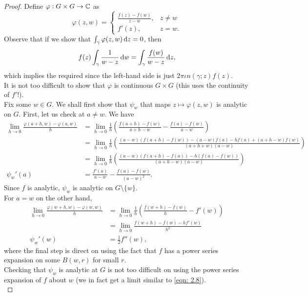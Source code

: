 	\begin{proof}
		Define $\varphi : G \times G \to \mathbb{C}$ as
		\[ \varphi(z,w) =
			\begin{cases}
				\frac{f(z) - f(w)}{z-w}, & z\ne w \\
				f'(z), & z=w.
			\end{cases}
		\]
		Observe that if we show that $\int_\gamma \varphi(z,w) \dif z = 0$, then
		\[ f(z) \int_\gamma \frac{1}{w-z} \dif w = \int_\gamma \frac{f(w)}{w-z} \dif z, \]
		which implies the required since the left-hand side is just $2\pi\iota n(\gamma;z) f(z)$.\\
		It is not too difficult to show that $\varphi$ is continuous $G\times G$ (this uses the continuity of $f'$!).\\
		Fix some $w \in G$. We shall first show that $\psi_w$ that maps $z \mapsto \varphi(z,w)$ is analytic on $G$. First, let us check at $a \ne w$. We have
		\begin{align*}
		 	\lim_{h\to 0} \frac{\varphi(a+h,w) - \varphi(a,w)}{h} &= \lim_{h\to 0} \frac{1}{h} \left( \frac{f(a+h) - f(w)}{a+h-w} - \frac{f(a) - f(w)}{a-w} \right) \\
		 		&= \lim_{h \to 0} \frac{1}{h} \left( \frac{(a-w) (f(a+h) - f(w)) - (a-w) f(a) - hf(a) + (a+h-w)f(w)}{(a+h+w)(a-w)} \right) \\
		 		&= \lim_{h \to 0} \frac{1}{h} \left( \frac{(a-w)(f(a+h)-f(a)) - h(f(a)-f(w))}{(a+h-w)(a-w)} \right) \\
		 	\psi_w'(a) &= \frac{f'(a)}{a-w} - \frac{f(a)-f(w)}{(a-w)^2}.
		\end{align*} 
		Since $f$ is analytic, $\psi_w$ is analytic on $G \setminus \{w\}$.\\
		For $a=w$ on the other hand,
		\begin{align}
			\lim_{h\to 0} \frac{\varphi(w+h,w) - \varphi(w,w)}{h} &= \lim_{h\to 0} \frac{1}{h} \left( \frac{f(w+h) - f(w)}{h} - f'(w) \right) \nonumber \\
				&= \lim_{h\to 0} \frac{f(w+h) - f(w) - hf'(w)}{h^2} \label{eqn: 2.8} \\
			\psi_w'(w) &= \frac{1}{2} f''(w), \nonumber
		\end{align}
		where the final step is direct on using the fact that $f$ has a power series expansion on some $B(w,r)$ for small $r$.\\
		Checking that $\psi_w$ is analytic at $G$ is not too difficult on using the power series expansion of $f$ about $w$ (we in fact get a limit similar to \eqref{eqn: 2.8}).\\

\end{proof}
